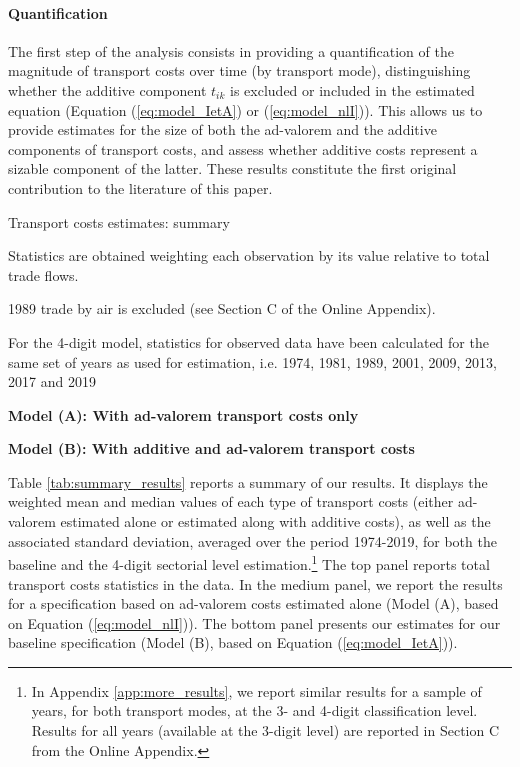 \documentclass[a4paper,11pt]{article}
\begin{document}
\paragraph{Quantification} The first step of the analysis consists in providing a quantification of the magnitude of transport costs over time (by transport mode), distinguishing whether the additive component $t_{ik}$ is excluded or included in the estimated equation (Equation (\ref{eq:model_IetA}) or (\ref{eq:model_nlI})).
This allows us to provide estimates for the size of both the ad-valorem and the additive components of transport costs, and assess whether additive costs represent a sizable component of the latter.
These results constitute the first original contribution to the literature of this paper.
\smallskip

\begin{table}[htbp]
 \centering
\caption{Transport costs estimates: summary} \vspace{5mm} \label{tab:summary_results}

		\begin{tablenotes}
		\scriptsize
		\item Statistics are obtained weighting each observation by its value relative to total trade flows.
		\item 1989 trade by air is excluded (see Section C of the Online Appendix).
		\item For the  4-digit model, statistics for observed data have been calculated for the same set of years as used for estimation, i.e.
		1974, 1981, 1989, 2001, 2009, 2013, 2017 and 2019
		\item \textbf{Model (A): With ad-valorem transport costs only}
		\item \textbf{Model (B): With additive and ad-valorem transport costs}
	\end{tablenotes}
\end{table}

Table \ref{tab:summary_results} reports a summary of our results.
It displays the weighted mean and median values of each type of transport costs (either ad-valorem estimated alone or estimated along with additive costs), as well as the associated standard deviation, averaged over the period 1974-2019, for both the baseline and the 4-digit sectorial level estimation.\footnote{In Appendix \ref{app:more_results}, we report similar results for a sample of years, for both transport modes, at the 3- and 4-digit classification level. Results for all years (available at the 3-digit level) are reported in Section C from the Online Appendix.}
The top panel reports total transport costs statistics in the data. In the medium panel, we report the results for a specification based on ad-valorem costs estimated alone (Model (A), based on Equation (\ref{eq:model_nlI})). The bottom panel presents our estimates for our baseline specification (Model (B), based on Equation (\ref{eq:model_IetA})).
\end{document}
